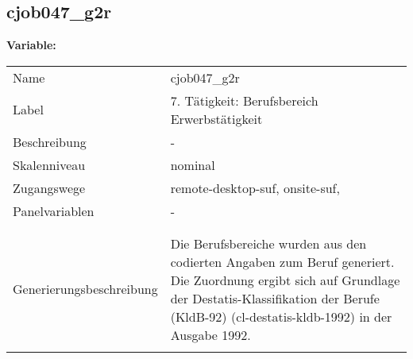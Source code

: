 	
	
	\subsection{cjob047\_g2r}
	\label{subSection:cjob047_g2r}

	\noindent\textbf{Variable:}\\
		\begin{tabular}{lL{11.3cm}}
			\label{tableVariable:cjob047_g2r}
			Name & cjob047\_g2r \\
			Label & 7. Tätigkeit: Berufsbereich Erwerbstätigkeit \\
			Beschreibung & - \\
			Skalenniveau & nominal \\
			Zugangswege &
				remote-desktop-suf,
				onsite-suf,
 \\
			Panelvariablen & -
			 \\
			 \\
 \\
					Generierungsbeschreibung & Die Berufsbereiche wurden aus den codierten Angaben zum Beruf generiert. Die Zuordnung ergibt sich auf Grundlage der Destatis-Klassifikation der Berufe (KldB-92) (cl-destatis-kldb-1992) in der Ausgabe 1992. 
				 \\	
			 \\
		\end{tabular}






